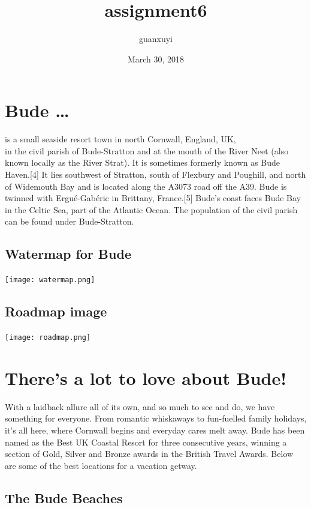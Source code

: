 \documentclass[]{article}
\title{assignment6}
\author{guanxuyi}
\date{March 30, 2018}
\begin{document}
\maketitle

\section{Bude \ldots{}}\label{bude}

is a small seaside resort town in north Cornwall, England, UK,\\
in the civil parish of Bude-Stratton and at the mouth of the River Neet
(also known locally as the River Strat). It is sometimes formerly known
as Bude Haven.{[}4{]} It lies southwest of Stratton, south of Flexbury
and Poughill, and north of Widemouth Bay and is located along the A3073
road off the A39. Bude is twinned with Ergué-Gabéric in Brittany,
France.{[}5{]} Bude's coast faces Bude Bay in the Celtic Sea, part of
the Atlantic Ocean. The population of the civil parish can be found
under Bude-Stratton.

\subsection{Watermap for Bude}\label{watermap-for-bude}

\texttt{[image: watermap.png]}

\subsection{Roadmap image}\label{roadmap-image}

\texttt{[image: roadmap.png]}

\section{There's a lot to love about
Bude!}\label{theres-a-lot-to-love-about-bude}

With a laidback allure all of its own, and so much to see and do, we
have something for everyone. From romantic whiskaways to fun-fuelled
family holidays, it's all here, where Cornwall begins and everyday cares
melt away. Bude has been named as the Best UK Coastal Resort for three
consecutive years, winning a section of Gold, Silver and Bronze awards
in the British Travel Awards. Below are some of the best locations for a
vacation getway.

\subsection{\texorpdfstring{\textbf{The Bude
Beaches}}{The Bude Beaches}}\label{the-bude-beaches}
\end{document}
